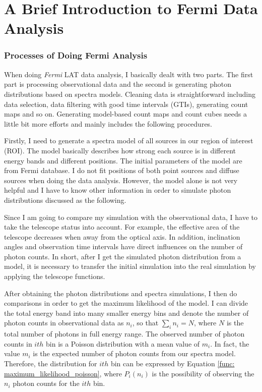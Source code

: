 \documentclass[a4paper, 12pt]{report}
\begin{document}
  \section{A Brief Introduction to Fermi Data Analysis}
    \subsubsection{Processes of Doing Fermi Analysis}
      When doing \textit{Fermi} LAT data analysis, I basically dealt with two parts. The 
      first part is processing observational data and the second is generating photon 
      distributions based on spectra models. Cleaning data is straightforward including data 
      selection, data filtering with good time intervals (GTIs), generating count maps 
      and so on. Generating model-based count maps and count cubes needs a little bit 
      more efforts and mainly includes the following procedures. 

      Firstly, I need to generate a spectra model of all sources in our region of 
      interest (ROI). The model basically describes how strong each source is in 
      different energy bands and different positions. The initial parameters of the 
      model are from Fermi database. I do not fit positions of both point sources and 
      diffuse sources when doing the data analysis. However, the model alone is not very 
      helpful and I have to know other information in order to simulate photon 
      distributions discussed as the following.

      Since I am going to compare my simulation with the observational data, I have to take 
      the telescope status into account. For example, the effective area of the telescope 
      decreases when away from the optical axis. In addition, inclination angles and 
      observation time intervals have direct influences on the number of photon counts. 
      In short, after I get the simulated photon distribution from a model, it is 
      necessary to transfer the initial simulation into the real simulation by applying 
      the telescope functions. 
          
      After obtaining the photon distributions and spectra simulations, I then do 
      comparisons in order to get the maximum likelihood of the model. I can divide the 
      total energy band into many smaller energy bins and denote
      the number of photon counts in observational data as $n_{i}$, so that 
      $\sum_{i}^{}n_{i} = N$, where $N$ is the total number of photons in full energy range. 
      The observed number of photon counts in $ith$ bin is a Poisson distribution with a 
      mean value of $m_{i}$. In fact, the value $m_{i}$ is the expected number of photon counts 
      from our spectra model. Therefore, the distribution for $ith$
      bin can be expressed by Equation \ref{func: maximum_likelihood_poisson}, where 
      $P_{i}\left(n_{i}\right)$ is the possibility of observing the $n_{i}$ photon counts 
      for the $ith$ bin. 
\end{document}
